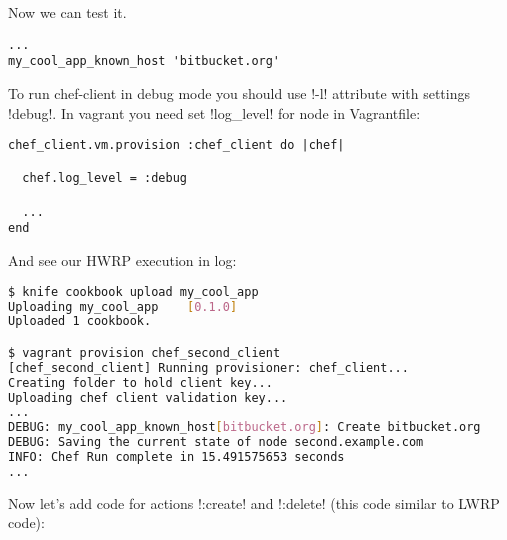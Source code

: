 Now we can test it.

\begin{lstlisting}[label=lst:cookbook-hwrp8]
...
my_cool_app_known_host 'bitbucket.org'
\end{lstlisting}

To run chef-client in debug mode you should use \inline!-l! attribute with settings \inline!debug!. In vagrant you need set \inline!log_level! for node in Vagrantfile:

\begin{lstlisting}[label=lst:cookbook-hwrp9]
chef_client.vm.provision :chef_client do |chef|

  chef.log_level = :debug

  ...
end
\end{lstlisting}

And see our HWRP execution in log:

\begin{lstlisting}[language=Bash,label=lst:cookbook-hwrp10]
$ knife cookbook upload my_cool_app
Uploading my_cool_app    [0.1.0]
Uploaded 1 cookbook.

$ vagrant provision chef_second_client
[chef_second_client] Running provisioner: chef_client...
Creating folder to hold client key...
Uploading chef client validation key...
...
DEBUG: my_cool_app_known_host[bitbucket.org]: Create bitbucket.org
DEBUG: Saving the current state of node second.example.com
INFO: Chef Run complete in 15.491575653 seconds
...
\end{lstlisting}

Now let's add code for actions \inline!:create! and \inline!:delete! (this code similar to LWRP code):

